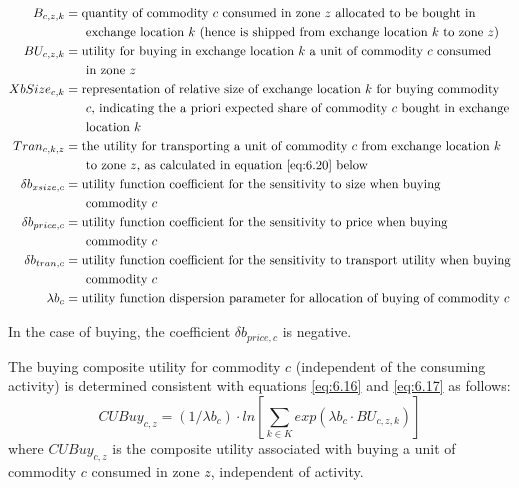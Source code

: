 \begin{align*}
B_{c,z,k} &= \text{quantity of commodity $c$ consumed in zone $z$ allocated to be bought in} \\
 &~~~~~\text{exchange location $k$ (hence is shipped from exchange location $k$ to zone $z$)} \\
BU_{c,z,k} &= \text{utility for buying in exchange location $k$ a unit of commodity $c$ consumed} \\
 &~~~~~\text{in zone $z$} \\
XbSize_{c,k} &= \text{representation of relative size of exchange location $k$ for buying commodity} \\
 &~~~~~\text{$c$, indicating the a priori expected share of commodity $c$ bought in exchange} \\
 &~~~~~\text{location $k$} \\
Tran_{c,k,z} &= \text{the utility for transporting a unit of commodity $c$ from exchange location $k$} \\
 &~~~~~\text{to zone $z$, as calculated in equation \ref{eq:6.20} below} \\
\delta b_{xsize,c} &= \text{utility function coefficient for the sensitivity to size when buying} \\
 &~~~~~\text{commodity $c$} \\
\delta b_{price,c} &= \text{utility function coefficient for the sensitivity to price when buying} \\
 &~~~~~\text{commodity $c$} \\
\delta b_{tran,c} &= \text{utility function coefficient for the sensitivity to transport utility when buying} \\
 &~~~~~\text{commodity $c$} \\
\lambda b_c &= \text{utility function dispersion parameter for allocation of buying of commodity $c$}
\end{align*}

In the case of buying, the coefficient $\delta b_{price,c}$ is negative.

The buying composite utility for commodity $c$ (independent of the consuming activity) is determined consistent with equations \ref{eq:6.16} and \ref{eq:6.17} as follows:
\begin{equation}\label{eq:6.18}
CUBuy_{c,z} = (1/\lambda b_c) \cdot ln \left[ \sum_{k \in K} exp(\lambda b_c \cdot BU_{c,z,k}) \right]
\end{equation}
\noindent where $CUBuy_{c,z}$ is the composite utility associated with buying a unit of commodity $c$ consumed in zone $z$, independent of activity. 

